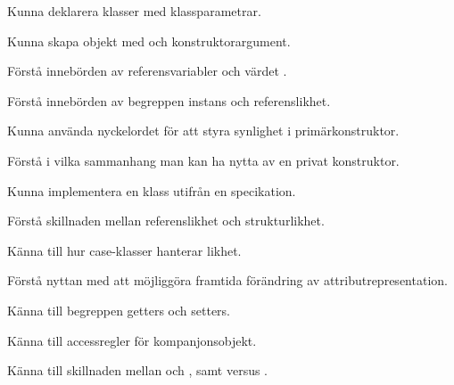 

\item Kunna deklarera klasser med klassparametrar.
\item Kunna skapa objekt med  och konstruktorargument.
\item Förstå innebörden av referensvariabler och värdet .
\item Förstå innebörden av begreppen instans och referenslikhet.
\item Kunna använda nyckelordet  för att styra synlighet i primärkonstruktor.
\item Förstå i vilka sammanhang man kan ha nytta av en privat konstruktor.
\item Kunna implementera en klass utifrån en specikation.
\item Förstå skillnaden mellan referenslikhet och strukturlikhet.
\item Känna till hur case-klasser hanterar likhet.
\item Förstå nyttan med att möjliggöra framtida förändring av attributrepresentation.
\item Känna till begreppen getters och setters.
\item Känna till accessregler för kompanjonsobjekt.
\item Känna till skillnaden mellan \code{==} och , samt \code{!=} versus .
